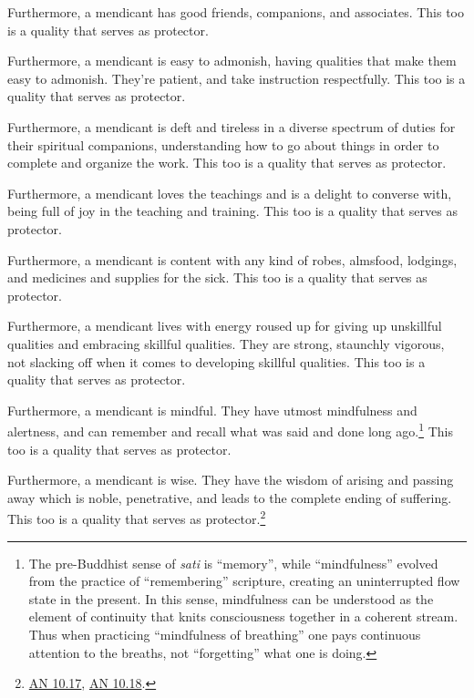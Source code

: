 \documentclass[12pt,openany]{book}%
\begin{document}
Furthermore, a mendicant has good friends, companions, and associates. This too is a quality that serves as protector. 

Furthermore, a mendicant is easy to admonish, having qualities that make them easy to admonish. They’re patient, and take instruction respectfully. This too is a quality that serves as protector. 

Furthermore, a mendicant is deft and tireless in a diverse spectrum of duties for their spiritual companions, understanding how to go about things in order to complete and organize the work. This too is a quality that serves as protector. 

Furthermore, a mendicant loves the teachings and is a delight to converse with, being full of joy in the teaching and training. This too is a quality that serves as protector. 

Furthermore, a mendicant is content with any kind of robes, almsfood, lodgings, and medicines and supplies for the sick. This too is a quality that serves as protector. 

Furthermore, a mendicant lives with energy roused up for giving up unskillful qualities and embracing skillful qualities. They are strong, staunchly vigorous, not slacking off when it comes to developing skillful qualities. This too is a quality that serves as protector. 

Furthermore, a mendicant is mindful. They have utmost mindfulness and alertness, and can remember and recall what was said and done long ago.\footnote{The pre-Buddhist sense of \textit{sati} is “memory”, while “mindfulness” evolved from the practice of “remembering” scripture, creating an uninterrupted flow state in the present. In this sense, mindfulness can be understood as the element of continuity that knits consciousness together in a coherent stream. Thus when practicing “mindfulness of breathing” one pays continuous attention to the breaths, not “forgetting” what one is doing. } This too is a quality that serves as protector. 

Furthermore, a mendicant is wise. They have the wisdom of arising and passing away which is noble, penetrative, and leads to the complete ending of suffering. This too is a quality that serves as protector.\footnote{\href{https://suttacentral.net/an10.17/en/sujato}{AN 10.17}, \href{https://suttacentral.net/an10.18/en/sujato}{AN 10.18}. } 
\end{document}
